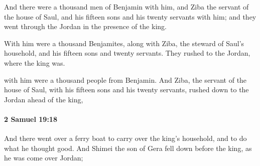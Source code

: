 			\begin{versebox}
					\item[BHS] 
					\item[ASV] And there were a thousand men of Benjamin with him, and Ziba the servant of the house of Saul, and his fifteen sons and his twenty servants with him; and they went through the Jordan in the presence of the king.
					\item[NIV] With him were a thousand Benjamites, along with Ziba, the steward of Saul’s household, and his fifteen sons and twenty servants. They rushed to the Jordan, where the king was.
					\item[NRSV] with him were a thousand people from Benjamin. And Ziba, the servant of the house of Saul, with his fifteen sons and his twenty servants, rushed down to the Jordan ahead of the king,
			\end{versebox}

		\paragraph{2 Samuel 19:18} %
			\label{2SAMUEL-19-18}

			And there went over a ferry boat to carry over the king’s household, and to do what he thought good. And Shimei the son of Gera fell down before the king, as he was come over Jordan;

